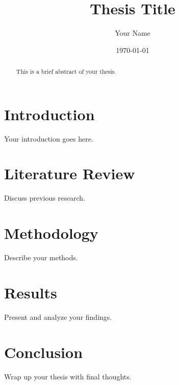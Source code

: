 \documentclass[a4paper,12pt]{report}
\title{Thesis Title}
\author{Your Name}
\date{\today}
\begin{document}
\maketitle

\begin{abstract}
This is a brief abstract of your thesis.
\end{abstract}

\tableofcontents

\chapter{Introduction}
Your introduction goes here.

\chapter{Literature Review}
Discuss previous research.

\chapter{Methodology}
Describe your methods.

\chapter{Results}
Present and analyze your findings.

\chapter{Conclusion}
Wrap up your thesis with final thoughts.
\end{document}
